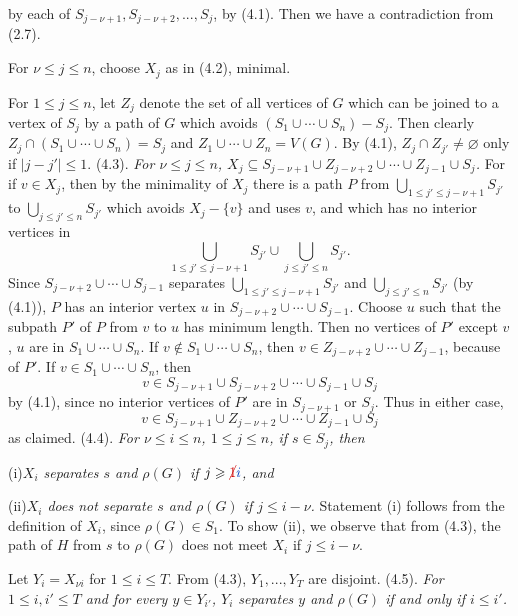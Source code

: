 \noindent by each of $S_{j-\nu+1}, S_{j-\nu+2},..., S_j$, by (4.1). Then we have a contradiction
from (2.7).

For $\nu\le j\le n$, choose $X_j$ as in (4.2), minimal.

For $1\le j\le n$, let $Z_j$ denote the set of all vertices of $G$ which can be joined
to a vertex of $S_j$ by a path of $G$ which avoids $(S_1\cup\cdots\cup S_n)-S_j$. Then
clearly $Z_j\cap(S_1\cup\cdots\cup S_n)=S_j$ and $Z_1\cup\cdots\cup Z_n=V(G)$. By (4.1),
$Z_j\cap Z_{j'}\ne\varnothing$ only if $|j-j'|\le 1$.
\stmt
(4.3). \textit{For $\nu\le j\le n$, $X_j\subseteq S_{j-\nu+1}\cup Z_{j-\nu+2}\cup\cdots\cup Z_{j-1}\cup S_j$.}
\stmt
For if $v\in X_j$, then by the minimality of $X_j$ there is a path $P$ from
$\bigcup_{1\le j'\le j-\nu+1}S_{j'}$ to $\bigcup_{j\le j'\le n}S_{j'}$ which avoids $X_j-\{v\}$ and uses $v$, and which
has no interior vertices in
\begin{equation*}
\bigcup_{1\le j'\le j-\nu+1}S_{j'}\cup\bigcup_{j\le j'\le n}S_{j'}.
\end{equation*}
Since $S_{j-\nu+2}\cup\cdots\cup S_{j-1}$ separates $\bigcup_{1\le j'\le j-\nu+1}S_{j'}$ and $\bigcup_{j\le j'\le n}S_{j'}$ (by
(4.1)), $P$ has an interior vertex $u$ in $S_{j-\nu+2}\cup\cdots\cup S_{j-1}$. Choose $u$ such
that the subpath $P'$ of $P$ from $v$ to $u$ has minimum length. Then no vertices
of $P'$ except $v$, $u$ are in $S_1\cup\cdots\cup S_n$. If $v\notin S_1\cup\cdots\cup S_n$, then
$v\in Z_{j-\nu+2}\cup\cdots\cup Z_{j-1}$, because of $P'$. If $v\in S_1\cup\cdots\cup S_n$, then
\begin{equation*}
v\in S_{j-\nu+1}\cup S_{j-\nu+2}\cup\cdots\cup S_{j-1}\cup S_j
\end{equation*}
by (4.1), since no interior vertices of $P'$ are in $S_{j-\nu+1}$ or $S_j$. Thus in either
case,
\begin{equation*}
v\in S_{j-\nu+1}\cup Z_{j-\nu+2}\cup\cdots\cup Z_{j-1}\cup S_j
\end{equation*}
as claimed.
\stmt
(4.4). \textit{For $\nu\le i\le n$, $1\le j\le n$, if $s\in S_j$, then}

\hspace*{12pt}(i)\enspace\textit{$X_i$ separates $s$ and $\rho(G)$ if $j\ge \delm{1}\fix{i}$, and}

\hspace*{12pt}(ii)\enspace\textit{$X_i$ does not separate $s$ and $\rho(G)$ if $j\le i-\nu$.}
\stmt
Statement (i) follows from the definition of $X_i$, since $\rho(G)\in S_1$. To show
(ii), we observe that from (4.3), the path of $H$ from $s$ to $\rho(G)$ does not meet
$X_i$ if $j\le i-\nu$.

Let $Y_i=X_{\nu i}$ for $1\le i\le T$. From (4.3), $Y_1,..., Y_T$ are disjoint.
\stmt
(4.5). \textit{For $1\le i, i'\le T$ and for every $y\in Y_{i'}$, $Y_i$ separates $y$ and $\rho(G)$ if
and only if $i\le i'$.}
